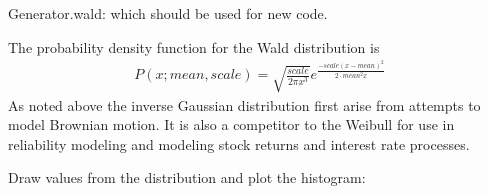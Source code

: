 \documentclass[letterpaper,10pt,english]{sphinxmanual}
\begin{document}
\begin{fulllineitems}
Generator.wald: which should be used for new code.

The probability density function for the Wald distribution is
\begin{equation*}
\begin{split}P(x;mean,scale) = \sqrt{\frac{scale}{2\pi x^3}}e^
\frac{-scale(x-mean)^2}{2\cdotp mean^2x}\end{split}
\end{equation*}
As noted above the inverse Gaussian distribution first arise
from attempts to model Brownian motion. It is also a
competitor to the Weibull for use in reliability modeling and
modeling stock returns and interest rate processes.

Draw values from the distribution and plot the histogram:

\begin{sphinxVerbatim}[commandchars=\\\{\}]
   
      
\end{sphinxVerbatim}

\end{fulllineitems}

\end{document}

